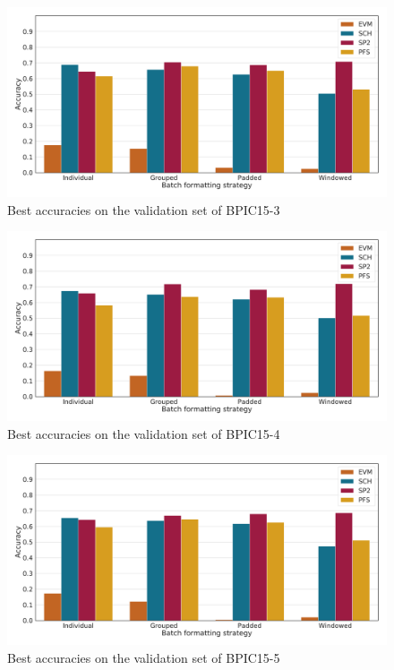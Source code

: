 \begin{figure}
    \centering
    \includegraphics[width=\textwidth]{gfx/bpic2015_3/accuracies.pdf}
    \caption{Best accuracies on the validation set of BPIC15-3}
    \label{fig:max-accuracies-bpic2015-3}
\end{figure}
\begin{figure}
    \centering
    \includegraphics[width=\textwidth]{gfx/bpic2015_4/accuracies.pdf}
    \caption{Best accuracies on the validation set of BPIC15-4}
    \label{fig:max-accuracies-bpic2015-4}
\end{figure}
\begin{figure}
    \centering
    \includegraphics[width=\textwidth]{gfx/bpic2015_5/accuracies.pdf}
    \caption{Best accuracies on the validation set of BPIC15-5}
    \label{fig:max-accuracies-bpic2015-5}
\end{figure}
